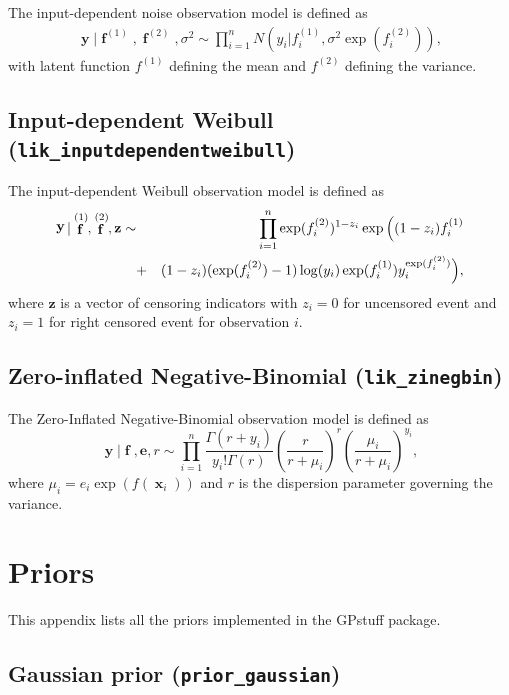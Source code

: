 \documentclass[twoside,11pt]{article}
\DeclareMathOperator{\x}{\mathbf{x}}
\DeclareMathOperator{\f}{\mathbf{f}}
\DeclareMathOperator{\y}{\mathbf{y}}
\newcommand{\mb}{\mathbf}
\newcommand{\code}[1]{{\normalfont\texttt{#1}}}
\begin{document}
The input-dependent noise observation model is defined as
\begin{align}
  \y|\f^{(1)}, \f^{(2)}, \sigma^2 \sim \prod_{i=1}^n N(y_i | f_i^{(1)}, \sigma^2 \exp(f_i^{(2)})),
\end{align}
with latent function $f^{(1)}$ defining the mean and $f^{(2)}$
defining the variance.

\subsection*{Input-dependent Weibull (\code{lik\_inputdependentweibull})}

The input-dependent Weibull observation model is defined as
\begin{eqnarray}
\y |\f^{(1)}, \f^{(2)},\mathbf{z}  \sim && \prod_{i=1}^n \exp(f_i^{(2)})^{1-z_i} \exp \Big{(} (1-z_i)f^{(1)}_i \\ \nonumber
 &+&(1-z_i)(\exp(f_i^{(2)})-1)\log(y_i)\exp(f^{(1)}_i)y_i^{\exp(f_i^{(2)})} \Big{)}, \nonumber
\end{eqnarray}
where $\mathbf{z}$ is a vector of censoring indicators with $z_i = 0$ for
uncensored event and $z_i = 1$ for right censored event for
observation $i$. 

\subsection*{Zero-inflated Negative-Binomial (\code{lik\_zinegbin})}
The Zero-Inflated Negative-Binomial observation model is defined as 
\begin{equation}
 \y |\f,\mb{e}, r  \sim \prod_{i=1}^n
 \frac{\Gamma(r+y_i)}{y_i!\Gamma(r)}
\left(\frac{r}{r+\mu_i}\right)^r \left(\frac{\mu_i}{r+\mu_i}\right)^{y_i},
\end{equation}
%
where $\mu_i = e_i\exp(f(\x_i))$ and $r$ is the dispersion parameter
governing the variance.



\section{Priors}

This appendix lists all the priors implemented in the
GPstuff package.

\subsection*{Gaussian prior (\code{prior\_gaussian})}
\end{document}
